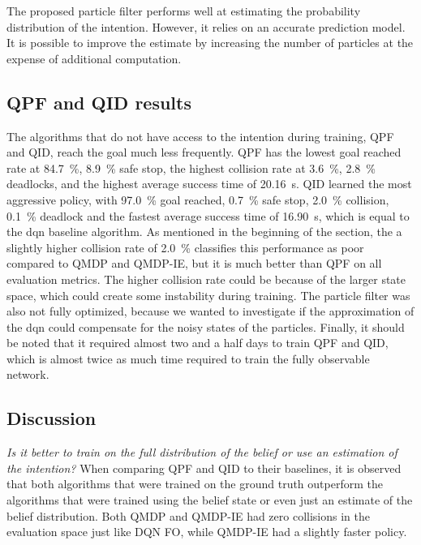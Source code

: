 The proposed particle filter performs well at estimating the probability distribution of the intention. However, it relies on an accurate prediction model. %
It is possible to improve the estimate by increasing the number of particles at the expense of additional computation.

\subsection{QPF and QID results}
The algorithms that do not have access to the intention during training, QPF and QID, reach the goal much less frequently. QPF has the lowest goal reached rate at \SI{84.7}{\percent}, \SI{8.9}{\percent} safe stop, the highest collision rate at \SI{3.6}{\percent}, \SI{2.8}{\percent} deadlocks, and the highest average success time of \SI{20.16}{\second}. QID learned the most aggressive policy, with \SI{97.0}{\percent} goal reached, \SI{0.7}{\percent} safe stop, \SI{2.0}{\percent} collision, \SI{0.1}{\percent} deadlock and the fastest average success time of \SI{16.90}{\second}, which is equal to the \gls{dqn} baseline algorithm. As mentioned in the beginning of the section, the a slightly higher collision rate of \SI{2.0}{\percent} classifies this performance as poor compared to QMDP and QMDP-IE, but it is much better than QPF on all evaluation metrics. 
The higher collision rate could be because of the larger state space, which could create some instability during training. The particle filter was also not fully optimized, because we wanted to investigate if the approximation of the \gls{dqn} could compensate for the noisy states of the particles. 
Finally, it should be noted that it required almost two and a half days to train QPF and QID, which is almost twice as much time required to train the fully observable network. 


\subsection{Discussion}

\label{sec:discussion}
\textit{Is it better to train on the full distribution of the belief or use an estimation of the intention?} When comparing QPF and QID to their baselines, it is observed that both algorithms that were trained on the ground truth outperform the algorithms that were trained using the belief state or even just an estimate of the belief distribution. Both QMDP and QMDP-IE had zero collisions in the evaluation space just like DQN FO, while QMDP-IE had a slightly faster policy. 


